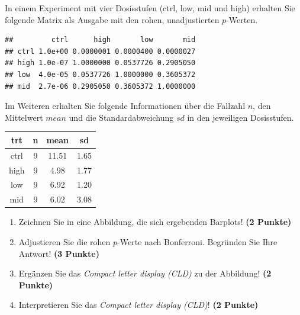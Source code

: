 \documentclass[a4paper, 10pt]{scrartcl}\usepackage[]{graphicx}\usepackage[]{xcolor}
\makeatletter
\newenvironment{kframe}{%
 \def\at@end@of@kframe{}%
 \ifinner\ifhmode%
  \def\at@end@of@kframe{\end{minipage}}%
  \begin{minipage}{\columnwidth}%
 \fi\fi%
 \def\FrameCommand##1{\hskip\@totalleftmargin \hskip-\fboxsep
 \colorbox{shadecolor}{##1}\hskip-\fboxsep
     \hskip-\linewidth \hskip-\@totalleftmargin \hskip\columnwidth}%
 \MakeFramed {\advance\hsize-\width
   \@totalleftmargin\z@ \linewidth\hsize
   \@setminipage}}%
 {\par\unskip\endMakeFramed%
 \at@end@of@kframe}
\newenvironment{knitrout}{}{} %
\makeatother
\begin{document}
In einem Experiment mit vier Dosisstufen (ctrl, low, mid und high) erhalten Sie
folgende Matrix als \Rlogo Ausgabe mit den rohen, unadjustierten $p$-Werten. 



\begin{knitrout}
\color{fgcolor}\begin{kframe}
\begin{verbatim}
##         ctrl      high       low       mid
## ctrl 1.0e+00 0.0000001 0.0000400 0.0000027
## high 1.0e-07 1.0000000 0.0537726 0.2905050
## low  4.0e-05 0.0537726 1.0000000 0.3605372
## mid  2.7e-06 0.2905050 0.3605372 1.0000000
\end{verbatim}
\end{kframe}
\end{knitrout}

Im Weiteren erhalten Sie folgende Informationen {\"u}ber die Fallzahl $n$, den
Mittelwert $mean$ und die Standardabweichung $sd$ in den jeweiligen Dosisstufen.

\begin{knitrout}
\color{fgcolor}\begin{table}[!h]
\centering
\begin{tabular}{cccc}
\toprule
trt & n & mean & sd\\
\midrule
ctrl & 9 & 11.51 & 1.65\\
high & 9 & 4.98 & 1.77\\
low & 9 & 6.92 & 1.20\\
mid & 9 & 6.02 & 3.08\\
\bottomrule
\end{tabular}
\end{table}

\end{knitrout}


\begin{enumerate}
\item Zeichnen Sie in eine Abbildung, die sich ergebenden Barplots! \textbf{(2 Punkte)}
\item Adjustieren Sie die rohen $p$-Werte nach Bonferroni. Begr{\"u}nden Sie Ihre Antwort! \textbf{(3 Punkte)}
\item Erg{\"a}nzen Sie das \textit{Compact letter display (CLD)} zu der
  Abbildung! \textbf{(2 Punkte)}
\item Interpretieren Sie das \textit{Compact letter display (CLD)}! \textbf{(2 Punkte)} 
\end{enumerate}
\end{document}
